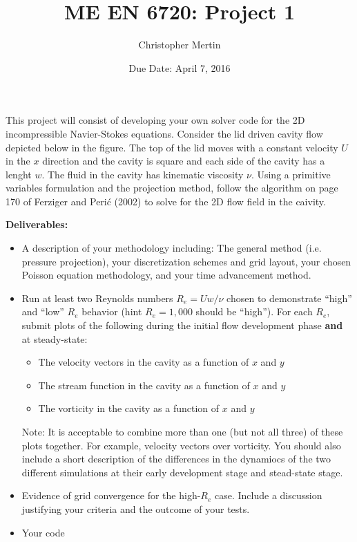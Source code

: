 \documentclass[addpoints]{exam}
\title{ME EN 6720: Project 1}
\date{Due Date: April 7, 2016}
\author{Christopher Mertin}
\begin{document}
\maketitle

\pointname{}
\bonuspointname{}
\pointformat{[\bfseries\thepoints]}

\printanswers



\begin{questions}
This project will consist of developing your own solver code for the 2D incompressible Navier-Stokes equations. Consider the lid driven cavity flow depicted below in the figure. The top of the lid moves with a constant velocity $U$ in the $x$ direction and the cavity is square and each side of the cavity has a lenght $w$. The fluid in the cavity has kinematic viscosity $\nu$. Using a primitive variables formulation and the projection method, follow the algorithm on page 170 of Ferziger and Peri\'{c} (2002) to solve for the 2D flow field in the caivity.

{\bf Deliverables:}
\begin{itemize}
\item A description of your methodology including: The general method (i.e. pressure projection), your discretization schemes and grid layout, your chosen Poisson equation methodology, and your time advancement method.
\item Run at least two Reynolds numbers $R_{e} = Uw/\nu$ chosen to demonstrate ``high'' and ``low'' $R_{e}$ behavior (hint $R_{e} = 1,000$ should be ``high''). For each $R_{e}$, submit plots of the following during the initial flow development phase {\bf and} at steady-state:
\begin{itemize}
\item The velocity vectors in the cavity as a function of $x$ and $y$
\item The stream function in the cavity as a function of $x$ and $y$
\item The vorticity in the cavity as a function of $x$ and $y$
\end{itemize}
Note: It is acceptable to combine more than one (but not all three) of these plots together. For example, velocity vectors over vorticity. You should also include a short description of the differences in the dynamiocs of the two different simulations at their early development stage and stead-state stage.
\item Evidence of grid convergence for the high-$R_{e}$ case. Include a discussion justifying your criteria and the outcome of your tests.
\item Your code
\end{itemize}


\end{questions}
\end{document}
